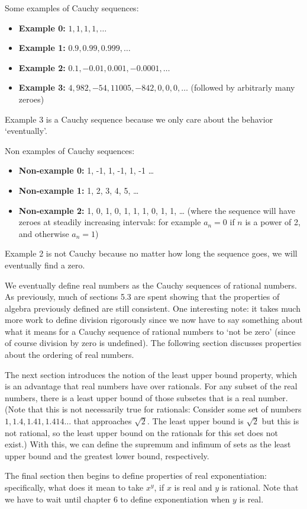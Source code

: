 \documentclass[answers,12pt]{exam}
\begin{document}
Some examples of Cauchy sequences:

\begin{itemize}
    \item \textbf{Example 0:}
    $1, 1, 1, 1, \dots$
    \item \textbf{Example 1:}
    $0.9, 0.99, 0.999, \dots$
    \item \textbf{Example 2:}
    $0.1, -0.01, 0.001, -0.0001, \dots$
    \item \textbf{Example 3:}
    $4, 982, -54, 11005, -842, 0, 0, 0, \dots$
    (followed by arbitrarly many zeroes)
\end{itemize}
Example 3 is a Cauchy sequence because we only care about the behavior `eventually'.

Non examples of Cauchy sequences:
\begin{itemize}
    \item \textbf{Non-example 0:}
    1, -1,  1, -1, 1, -1 \dots
    \item \textbf{Non-example 1:}
    1, 2, 3, 4, 5, \dots
    \item \textbf{Non-example 2:}
    1, 0, 1, 0, 1, 1, 1, 0, 1, 1, \dots
    (where the sequence will have zeroes at steadily increasing intervals: for example $a_n = 0$ if $n$ is a power of 2, and otherwise $a_n=1$)
\end{itemize}
Example 2 is not Cauchy because no matter how long the sequence goes, we will eventually find a zero.

We eventually define real numbers as the Cauchy sequences of rational numbers.
As previously, much of sections 5.3 are spent showing that the properties of algebra previously defined are still consistent.
One interesting note: it takes much more work to define division rigorously since we now have to say something about what it means for a Cauchy sequence of rational numbers to `not be zero' (since of course division by zero is undefined).
The following section discusses properties about the ordering of real numbers.

The next section introduces the notion of the least upper bound property, which is an advantage that real numbers have over rationals.
For any subset of the real numbers, there is a least upper bound of those subsetes that is a real number. 
(Note that this is not necessarily true for rationals:
Consider some set of numbers $1, 1.4, 1.41, 1.414 \dots$ that approaches $\sqrt{2}$.
The least upper bound is $\sqrt{2}$ but this is not rational, so the least upper bound on the rationals for this set does not exist.)
With this, we can define the supremum and infimum of sets as the least upper bound and the greatest lower bound, respectively.

The final section then begins to define properties of real exponentiation:
specifically, what does it mean to take $x^y$, if $x$ is real and $y$ is rational.
Note that we have to wait until chapter 6 to define exponentiation when $y$ is real.
\end{document}

